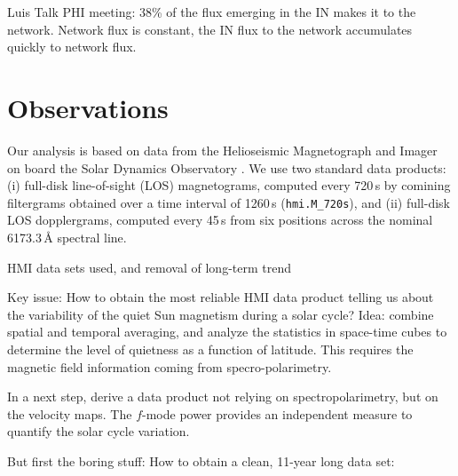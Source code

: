 \documentclass{aa}
\begin{document}
\cite[]{2019LRSP...16....1B}
Luis Talk PHI meeting: 38\% of the flux emerging in the IN makes it to the network. Network flux is constant, the IN flux to the network accumulates quickly to network flux.

\cite[]{2015ApJ...806..174J}

\cite[]{2013A&A...555A..33B}

\cite[]{2021arXiv210508657F}

\cite[]{2021arXiv210514533R}

\cite[]{ballot2021changes}

\section{Observations}

Our analysis is based on data from the Helioseismic Magnetograph and Imager \cite[HMI,][]{2012SoPh..275..207S,2012SoPh..275..229S} on board the Solar Dynamics Observatory \cite[SDO,][]{2012SoPh..275....3P}. We use two standard data products: (i) full-disk line-of-sight (LOS) magnetograms, computed every 720\,s by comining filtergrams obtained over a time interval of 1260\,s (\texttt{hmi.M\_720s}), and (ii) full-disk LOS dopplergrams, computed every 45\,s from six positions across the nominal 6173.3\,\AA{} spectral line. 

HMI data sets used, and removal of long-term trend

Key issue: 
How to obtain the most reliable HMI data product telling us about the variability of the quiet Sun magnetism during a solar cycle? Idea: combine spatial and temporal averaging, and analyze the statistics in space-time cubes to determine the level of quietness as a function of latitude. This requires the magnetic field information coming from specro-polarimetry. 

In a next step, derive a data product not relying on spectropolarimetry, but on the \los{} velocity maps. The $f$-mode power provides an independent measure to quantify the solar cycle variation.

But first the boring stuff: How to obtain a clean, 11-year long data set:
\end{document}
